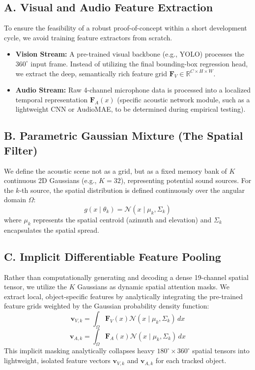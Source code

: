 \documentclass{article}
\begin{document}
\subsection{A. Visual and Audio Feature Extraction}
To ensure the feasibility of a robust proof-of-concept within a short development cycle, we avoid training feature extractors from scratch.
\begin{itemize}
    \item \textbf{Vision Stream:} A pre-trained visual backbone (e.g., YOLO) processes the $360^\circ$ input frame. Instead of utilizing the final bounding-box regression head, we extract the deep, semantically rich feature grid $\mathbf{F}_V \in \mathbb{R}^{C \times H \times W}$.
    \item \textbf{Audio Stream:} Raw 4-channel microphone data is processed into a localized temporal representation $\mathbf{F}_A(x)$ (specific acoustic network module, such as a lightweight CNN or AudioMAE, to be determined during empirical testing).
\end{itemize}

\subsection{B. Parametric Gaussian Mixture (The Spatial Filter)}
We define the acoustic scene not as a grid, but as a fixed memory bank of $K$ continuous 2D Gaussians (e.g., $K=32$), representing potential sound sources. For the $k$-th source, the spatial distribution is defined continuously over the angular domain $\Omega$:
\begin{equation}
    g(x \mid \theta_k) = \mathcal{N}(x \mid \mu_k, \Sigma_k)
\end{equation}
where $\mu_k$ represents the spatial centroid (azimuth and elevation) and $\Sigma_k$ encapsulates the spatial spread.

\subsection{C. Implicit Differentiable Feature Pooling}
Rather than computationally generating and decoding a dense 19-channel spatial tensor, we utilize the $K$ Gaussians as dynamic spatial attention masks. We extract local, object-specific features by analytically integrating the pre-trained feature grids weighted by the Gaussian probability density function:
\begin{equation}
    \mathbf{v}_{V,k} = \int_{\Omega} \mathbf{F}_V(x) \mathcal{N}(x \mid \mu_k, \Sigma_k) \, dx
\end{equation}
\begin{equation}
    \mathbf{v}_{A,k} = \int_{\Omega} \mathbf{F}_A(x) \mathcal{N}(x \mid \mu_k, \Sigma_k) \, dx
\end{equation}
This implicit masking analytically collapses heavy $180^\circ \times 360^\circ$ spatial tensors into lightweight, isolated feature vectors $\mathbf{v}_{V,k}$ and $\mathbf{v}_{A,k}$ for each tracked object.
\end{document}
